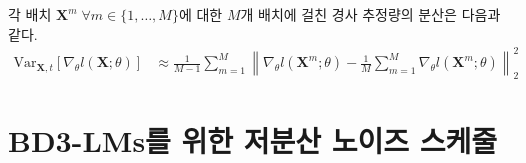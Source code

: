 \documentclass{article} %
\newcommand{\vkl}[1]{\textcolor{blue}{[VK: #1]}}
\def\algos{BD3-LMs}
\begin{document}
각 배치 $\mathbf{X}^m \; \forall m \in \{ 1, \dots, M\}$에 대한 $M$개 배치에 걸친 경사 추정량의 분산은 다음과 같다.
 \begin{align}\label{eq:grad-var-estimator}
     \text{Var}_{\mathbf{X}, t}\left[
    \nabla_\theta l (\mathbf{X}; \theta) \right] 
&\approx  \frac{1}{M-1} \sum_{m=1}^M \left\lVert 
    \nabla_\theta l (\mathbf{X}^m; \theta) - \frac{1}{M} \sum_{m=1}^M \nabla_\theta l(\mathbf{X}^m; \theta)
\right\rVert^2_2
\end{align}








\section{\algos{}를 위한 저분산 노이즈 스케줄}
\end{document}
